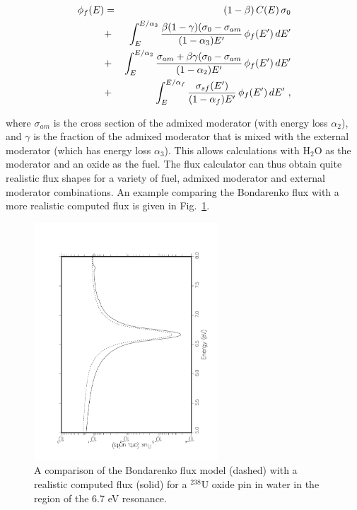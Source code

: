   \begin{eqnarray}
    [\sigma_0+\sigma_t(E)]\,\phi_f(E)&=&
    (1-\beta)\,{C(E)\,\sigma_0}\nonumber\\
    &+&\int_E^{E/\alpha_3}{{\beta(1-\gamma)(\sigma_0-\sigma_{am}}\over
    {(1-\alpha_3)E'}}\,\phi_f(E')\,dE'\nonumber\\
    &+&\int_E^{E/\alpha_2}{{\sigma_{am}+\beta\gamma(\sigma_0-\sigma_{am}}\over
    {(1-\alpha_2)E'}}\,\phi_f(E')\,dE'\nonumber\\
    &+&\int_E^{E/\alpha_f}{{\sigma_{sf}(E')} \over
    {(1-\alpha_f)E'}}\,\phi_f(E')\,dE'\,\,,
  \label{Eq37a}
  \end{eqnarray}

\noindent
where $\sigma_{am}$ is the cross section of the admixed moderator
(with energy loss $\alpha_2$), and $\gamma$ is the fraction of the
admixed moderator that is mixed with the external moderator (which has
energy loss $\alpha_3$).  This allows calculations with H$_2$O as the
moderator and an oxide as the fuel.  The flux calculator can thus obtain
quite realistic flux shapes for a variety of fuel, admixed moderator and
external moderator combinations.  An example comparing the Bondarenko
flux with a more realistic computed flux is given in Fig.~\ref{gr2}.

\begin{figure}[thb]\centering
\includegraphics[keepaspectratio, height=3.5in, angle=270]{figs/groupr2ack}
\caption[Flux model predictions for $^{238}$UO$_2$ in water in the region
 near the 6.7 eV $^{238}$U resonance]{A comparison of the Bondarenko flux
 model (dashed) with a realistic computed flux (solid) for a $^{238}$U oxide
 pin in water in the region of the 6.7 eV resonance.}
\label{gr2}
\end{figure}

